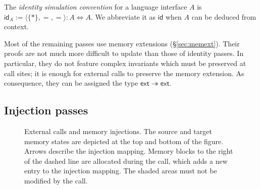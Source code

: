 \documentclass[acmsmall,authordraft]{acmart}
\newcommand{\kw}[1]{\ensuremath{ \mathsf{#1} }}
\begin{document}
\begin{definition} %
The \emph{identity simulation convention} for
a language interface $A$ is
$\kw{id}_A := \langle \{*\}, {=}, {=} \rangle : A \Leftrightarrow A$.
We abbreviate it as $\kw{id}$ when $A$ can be deduced
from context.
\end{definition}

Most of the remaining passes use memory extensions
(\S\ref{sec:memext}).
Their proofs are not much more difficult to update
than those of identity passes.
In particular,
they do not feature complex invariants
which must be preserved at call sites;
it is enough for external calls to preserve
the memory extension.
As consequence,
they can be assigned the type $\kw{ext} \twoheadrightarrow \kw{ext}$.


\subsection{Injection passes} \label{sec:pass:inj} %

\begin{figure} %
  \caption{External calls and memory injections.
    The source and target memory states are
    depicted at the top and bottom
    of the figure. Arrows describe the injection mapping.
    Memory blocks to the right of the dashed line
    are allocated during the call,
    which adds a new entry to the injection mapping.
    The shaded areas must not be modified by the call.
  }
  \label{fig:injp}
\end{figure}
\end{document}
